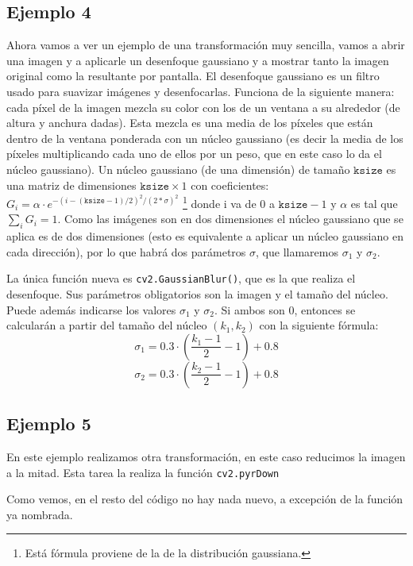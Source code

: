 \documentclass[a4paper,openright, 12pt]{book}
\begin{document}
\subsection*{Ejemplo 4}
Ahora vamos a ver un ejemplo de una transformación muy sencilla, vamos a abrir una imagen y a aplicarle un desenfoque gaussiano y a mostrar tanto la imagen original como la resultante por pantalla. El desenfoque gaussiano es un filtro usado para suavizar imágenes y desenfocarlas. Funciona de la siguiente manera: cada píxel de la imagen mezcla su color con los de un ventana a su alrededor (de altura y anchura dadas). Esta mezcla es una media de los píxeles que están dentro de la ventana ponderada con un núcleo gaussiano (es decir la media de los píxeles multiplicando cada uno de ellos por un peso, que en este caso lo da el núcleo gaussiano). Un núcleo gaussiano (de una dimensión) de tamaño $\texttt{ksize}$ es una matriz de dimensiones $ \texttt{ksize}\times1$ con coeficientes:
$ G_i= \alpha \cdot e^{-(i-( \texttt{ksize} -1)/2)^2/(2* \sigma )^2}$ \footnote{Está fórmula proviene de la de la distribución gaussiana.} donde i va de $0$ a $\texttt{ksize}-1$ y $\alpha$ es tal que  $\sum_i G_i=1$. Como las imágenes son en dos dimensiones el núcleo gaussiano que se aplica es de dos dimensiones (esto es equivalente a aplicar un núcleo gaussiano en cada dirección), por lo que habrá dos parámetros $\sigma$, que llamaremos $\sigma_1$ y $\sigma_2$.

La única función nueva es 
\lstinline|cv2.GaussianBlur()|, que es la que realiza el desenfoque.
Sus parámetros obligatorios son la imagen y el tamaño del núcleo. Puede además indicarse los valores $\sigma_1$ y $\sigma_2$. Si ambos son 0, entonces se calcularán a partir del tamaño del núcleo $(k_1, k_2)$ con la siguiente fórmula:
\begin{equation*}
\sigma_1 = 0.3\cdot(\frac{k_1-1}{2} - 1) + 0.8
\end{equation*}
\begin{equation*}
\sigma_2 = 0.3\cdot(\frac{k_2-1}{2} - 1) + 0.8
\end{equation*}



\newpage

\subsection*{Ejemplo 5}
En este ejemplo realizamos otra transformación, en este caso reducimos la imagen a la mitad. Esta tarea la realiza la función \lstinline|cv2.pyrDown|

Como vemos, en el resto del código no hay nada nuevo, a excepción de la función ya nombrada.
\newpage
\end{document}
